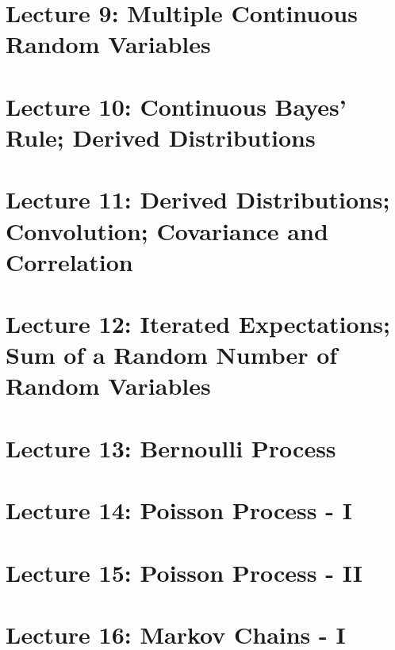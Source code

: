 \documentclass{article}
\begin{document}


\section{Lecture 9: Multiple Continuous Random Variables}



\section{Lecture 10: Continuous Bayes' Rule; Derived Distributions}



\section{Lecture 11: Derived Distributions; Convolution; Covariance and Correlation}



\section{Lecture 12: Iterated Expectations; Sum of a Random Number of Random Variables}



\section{Lecture 13: Bernoulli Process}



\section{Lecture 14: Poisson Process - I}



\section{Lecture 15: Poisson Process - II}



\section{Lecture 16: Markov Chains - I}
\end{document}
